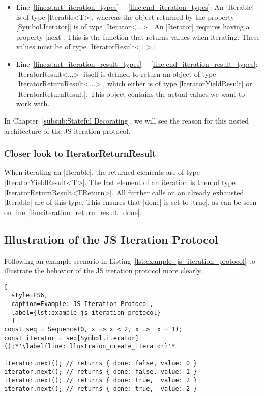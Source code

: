 \begin{itemize}
  \item{Line~\ref{line:start_iteration_types}~-~\ref{line:end_iteration_types}: 
      An |Iterable| is of type |Iterable<T>|, whereas the object returned by the property
      |[Symbol.Iterator]| is of type |Iterator<...>|. An |Iterator| requires having a property |next|. 
      This is the function that returns values when iterating. These values must be 
      of type |IteratorResult<...>.|
    }
  \item{Line~\ref{line:start_iteration_result_types}~-~\ref{line:end_iteration_result_types}:
      |IteratorResult<...>| itself is defined to return an 
      object of type |IteratorReturnResult<...>|, which either is of type
      |IteratorYieldResult| or |IteratorReturnResult|. This object contains the actual 
      values we want to work with.}
\end{itemize}

In Chapter~\ref{subsub:Stateful Decorating}, we will see the reason for this
nested architecture of the JS iteration protocol.

\subsubsection{Closer look to IteratorReturnResult}
\label{subsub:Closer look to IteratorReturnResult}
When iterating an |Iterable|, the returned elements are of type
|IteratorYieldResult<T>|. The last element of an iteration is then of type
|IteratorReturnResult<TReturn>|. All further calls on an already exhausted
|Iterable| are of this type. This ensures that |done| is set to |true|, as 
can be seen on line~\ref{line:iteration_return_result_done}.


\subsection{Illustration of the JS Iteration Protocol}
\label{sub:Illustration of the JS Iteration Protocol}
Following an example scenario in Listing~\ref{lst:example_js_iteration_protocol}
to illustrate the behavior of the JS iteration protocol more clearly.

\begin{lstlisting}[
  style=ES6, 
  caption=Example: JS Iteration Protocol,
  label={lst:example_js_iteration_protocol}
  ]
const seq = Sequence(0, x => x < 2, x =>  x + 1); 
const iterator = seq[Symbol.iterator]();*'\label{line:illustraion_create_iterator}'*

iterator.next(); // returns { done: false, value: 0 }
iterator.next(); // returns { done: false, value: 1 }
iterator.next(); // returns { done: true,  value: 2 }
iterator.next(); // returns { done: true,  value: 2 }
\end{lstlisting}


